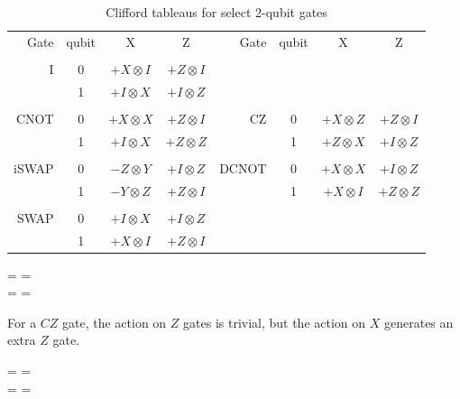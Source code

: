\begin{table}[tp]
\caption{Clifford tableaus for select 2-qubit gates}
\label{Fig:CliffordTableaus}
\begin{center}
\begin{tabular}{rcccrccc}
Gate & qubit & X & Z & \hspace{2em} Gate & qubit & X & Z \\
\\
I & 0 & $+ X \otimes I$ & $+ Z \otimes I$ \\
	 & 1 & $+ I \otimes X$ & $+ I \otimes Z$ \\
\\
CNOT & 0 & $+ X \otimes X$ & $+ Z \otimes I$ & CZ   & 0 & $+ X \otimes Z$ & $+ Z \otimes I$ \\
	 & 1 & $+ I \otimes X$ & $+ Z \otimes Z$ &      & 1 & $+ Z \otimes X$ & $+ I \otimes Z$\\
\\
iSWAP & 0 & $- Z \otimes Y$ & $+ I \otimes Z$ & DCNOT & 0 & $+ X \otimes X$ & $+ I \otimes Z$  \\
      & 1 & $- Y \otimes Z$ & $+ Z \otimes I$ &       & 1 & $+ X \otimes I$ & $+ Z \otimes Z$  \\
\\
SWAP & 0 & $+ I \otimes X$ & $+ I \otimes Z$ \\
	 & 1 & $+ X \otimes I$ & $+ Z \otimes I$ \\
\end{tabular}
\end{center}
\end{table}


\begin{center}
 =  
\hspace{2em}
  =   
\\
 =   
\hspace{2em}
 = 
\end{center}


For a $CZ$ gate, the action on $Z$ gates is trivial, but the action on $X$ generates an extra $Z$ gate.
\begin{center}
 =  
\hspace{2em}
  =   
\\
 =   
\hspace{2em}
 = 
\end{center}

